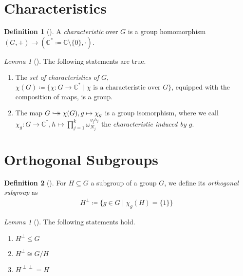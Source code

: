 \documentclass[10pt]{amsart}
\numberwithin{equation}{section}
\theoremstyle{definition}
\newtheorem{definition}{Definition}
\theoremstyle{remark}
\newtheorem{lemma}[theorem]{Lemma}
\newcommand{\hookdoubleheadrightarrow}{%
  \hookrightarrow\mathrel{\mspace{-15mu}}\rightarrow
}
\begin{document}
    \section{Characteristics}

    \begin{definition}[{\cite[p. 17]{Lomont}}]
        A \emph{characteristic} over \(G\) is a group homomorphism \((G, +) \to (\mathbb{C}^* \coloneqq \mathbb{C} \setminus \{0\}, \cdot)\).
    \end{definition}
    \begin{lemma}[{\cite[p. 18]{Lomont}}]
        The following statements are true.
        \begin{enumerate}[label=(\roman*)]
            \item The \emph{set of characteristics of \(G\)}, \(\chi(G) \coloneqq \{\chi\colon G \to \mathbb{C}^* \mid \chi \text{ is a characteristic over } G\}\), equipped with the composition of maps, is a group.
            \item The map \(G \hookdoubleheadrightarrow \chi(G), g \mapsto \chi_g\) is a group isomorphism, where we call \(\chi_g\colon G \to \mathbb{C}^*, h \mapsto \prod_{j=1}^k \omega_{N_j}^{g_jh_j}\) the \emph{characteristic induced by \(g\)}.
        \end{enumerate}
    \end{lemma}

    \section{Orthogonal Subgroups}

    \begin{definition}[{\cite[p. 18]{Lomont}}]
        For \(H \subseteq G\) a subgroup of a group \(G\), we define its \emph{orthogonal subgroup} as
        \begin{align}
            H^\perp \coloneqq \{g \in G \mid \chi_g(H) = \{1\}\}
        \end{align}
    \end{definition}

    \begin{lemma}[{\cite*[pp. 19-20]{Lomont}}] \label{orthogonal_subgroups_lemma_1}
        The following statements hold.
        \begin{enumerate}[label=(\roman*)]
            \item \label{orthogonal_subgroups_lemma_1_1} \(H^{\perp} \leq G\)
            \item \label{orthogonal_subgroups_lemma_1_2} \(H^\perp \cong G/H\)
            \item \label{orthogonal_subgroups_lemma_1_3} \(H^{\perp \perp} = H\)
        \end{enumerate}
    \end{lemma}
\end{document}

